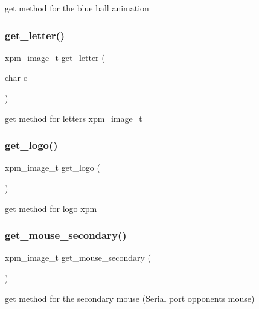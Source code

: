get method for the blue ball animation 

\mbox{\label{group__XPM_gaeaf4a2c369709099c0355fca8ecbd497}} 
\subsubsection{\texorpdfstring{get\+\_\+letter()}{get\_letter()}}
{\footnotesize\ttfamily xpm\+\_\+image\+\_\+t get\+\_\+letter (\begin{DoxyParamCaption}\item[{char}]{c }\end{DoxyParamCaption})}



get method for letters xpm\+\_\+image\+\_\+t 

\mbox{\label{group__XPM_ga7e3ffa96f2cef7445fadb7a3da526d2f}} 
\subsubsection{\texorpdfstring{get\+\_\+logo()}{get\_logo()}}
{\footnotesize\ttfamily xpm\+\_\+image\+\_\+t get\+\_\+logo (\begin{DoxyParamCaption}{ }\end{DoxyParamCaption})}



get method for logo xpm 

\mbox{\label{group__XPM_gaec66ab419acf718b6b5b4234723b281c}} 
\subsubsection{\texorpdfstring{get\+\_\+mouse\+\_\+secondary()}{get\_mouse\_secondary()}}
{\footnotesize\ttfamily xpm\+\_\+image\+\_\+t get\+\_\+mouse\+\_\+secondary (\begin{DoxyParamCaption}{ }\end{DoxyParamCaption})}



get method for the secondary mouse (Serial port opponent\textquotesingle{}s mouse) 

